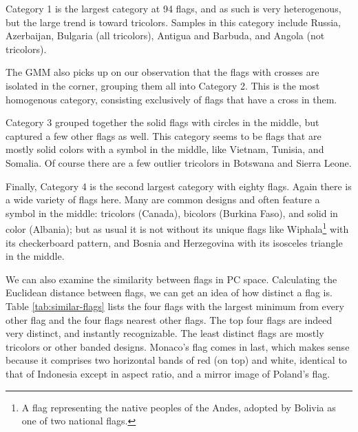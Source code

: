 \documentclass[11pt]{amsart}
\begin{document}
Category 1 is the largest category at 94 flags, and as such is very
heterogenous, but the large trend is toward tricolors. Samples in this category
include Russia, Azerbaijan, Bulgaria (all tricolors), Antigua and Barbuda, and
Angola (not tricolors).

The GMM also picks up on our observation that the flags with crosses are
isolated in the corner, grouping them all into Category 2. This is the most
homogenous category, consisting exclusively of flags that have a cross in them.

Category 3 grouped together the solid flags with
circles in the middle, but captured a few other flags as well. This category
seems to be flags that are mostly solid colors with a symbol in the middle, like
Vietnam, Tunisia, and Somalia. Of course there are a few outlier tricolors in
Botswana and Sierra Leone.

Finally, Category 4 is the second largest category with eighty flags. Again
there is a wide variety of flags here. Many are common designs and often feature
a symbol in the middle: tricolors (Canada), bicolors (Burkina Faso), and solid
in color (Albania); but as usual it is not without its unique flags like
Wiphala\footnote{A flag representing the native peoples of the Andes, adopted by
Bolivia as one of two national flags.} with its checkerboard pattern, and Bosnia
and Herzegovina with its isosceles triangle in the middle.

We can also examine the similarity between flags in PC space. Calculating the
Euclidean distance between flags, we can get an idea of how distinct a flag is.
Table \ref{tab:similar-flags} lists the four flags with the largest minimum from
every other flag and the four flags nearest other flags. The top four flags are
indeed very distinct, and instantly recognizable. The least distinct flags are
mostly tricolors or other banded designs. Monaco's flag comes in last, which
makes sense because it comprises two horizontal bands of red (on top) and white,
identical to that of Indonesia except in aspect ratio, and a mirror image of
Poland's flag.
\end{document}
